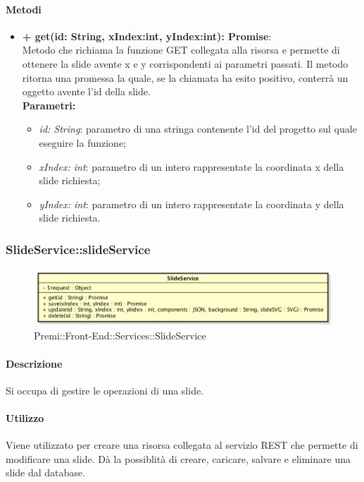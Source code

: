 		\paragraph{Metodi}
		\begin{itemize}
			\item \textbf{+ get(id: String, xIndex:int, yIndex:int): Promise}:\\
			Metodo che richiama la funzione GET collegata alla risorsa e permette di ottenere la slide avente x e y corrispondenti ai parametri passati. Il metodo ritorna una promessa la quale, se la chiamata ha esito positivo, conterrà un oggetto avente l'id della slide.\\
			\textbf{Parametri:}\\
			\begin{itemize}
				\item \textit{id: String}: parametro di una stringa contenente l'id del progetto sul quale eseguire la funzione;
				\item \textit{xIndex: int}: parametro di un intero rappresentate la coordinata x della slide richiesta;
				\item \textit{yIndex: int}: parametro di un intero rappresentate la coordinata y della slide richiesta.
			\end{itemize}
		\end{itemize}
\newpage
		
		\subsubsection{SlideService::slideService}
		\begin{figure}[h]
			\centering
				\includegraphics[width=0.5\linewidth]{img/premi_front_end_services_slideservice}
			\caption[Premi::Front-End::Services::SlideService]{Premi::Front-End::Services::SlideService}
		\end{figure}
		
		\paragraph{Descrizione}
		Si occupa di gestire le operazioni di una slide.
		
		\paragraph{Utilizzo}
		Viene utilizzato per creare una risorsa collegata al servizio REST che permette di modificare una slide. Dà la possiblità di creare, caricare, salvare e eliminare una slide dal database.
		
